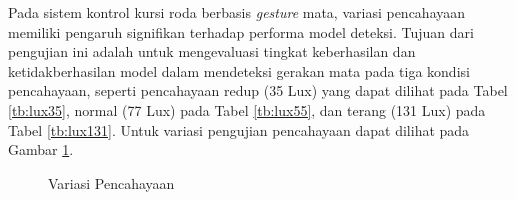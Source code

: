 Pada sistem kontrol kursi roda berbasis \emph{gesture} mata, variasi pencahayaan memiliki pengaruh signifikan terhadap performa model deteksi. Tujuan dari pengujian ini adalah untuk mengevaluasi tingkat keberhasilan dan ketidakberhasilan model dalam mendeteksi gerakan mata pada tiga kondisi pencahayaan, seperti pencahayaan redup (35 Lux) yang dapat dilihat pada Tabel \ref{tb:lux35}, normal (77 Lux) pada Tabel \ref{tb:lux55}, dan terang (131 Lux) pada Tabel \ref{tb:lux131}. Untuk variasi pengujian pencahayaan dapat dilihat pada Gambar \ref{fig:Variasi Pencahayaan}.

\begin{figure}[H]
  \centering
  \hfil


  \caption{Variasi Pencahayaan}
  \label{fig:Variasi Pencahayaan}
\end{figure}

